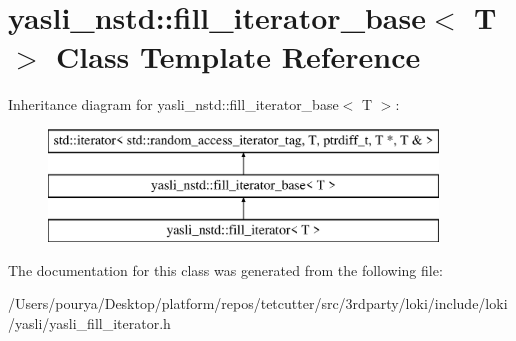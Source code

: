 \hypertarget{classyasli__nstd_1_1fill__iterator__base}{}\section{yasli\+\_\+nstd\+:\+:fill\+\_\+iterator\+\_\+base$<$ T $>$ Class Template Reference}
\label{classyasli__nstd_1_1fill__iterator__base}
Inheritance diagram for yasli\+\_\+nstd\+:\+:fill\+\_\+iterator\+\_\+base$<$ T $>$\+:\begin{figure}[H]
\begin{center}
\leavevmode
\includegraphics[height=3.000000cm]{classyasli__nstd_1_1fill__iterator__base}
\end{center}
\end{figure}


The documentation for this class was generated from the following file\+:\begin{DoxyCompactItemize}
\item 
/\+Users/pourya/\+Desktop/platform/repos/tetcutter/src/3rdparty/loki/include/loki/yasli/yasli\+\_\+fill\+\_\+iterator.\+h\end{DoxyCompactItemize}
